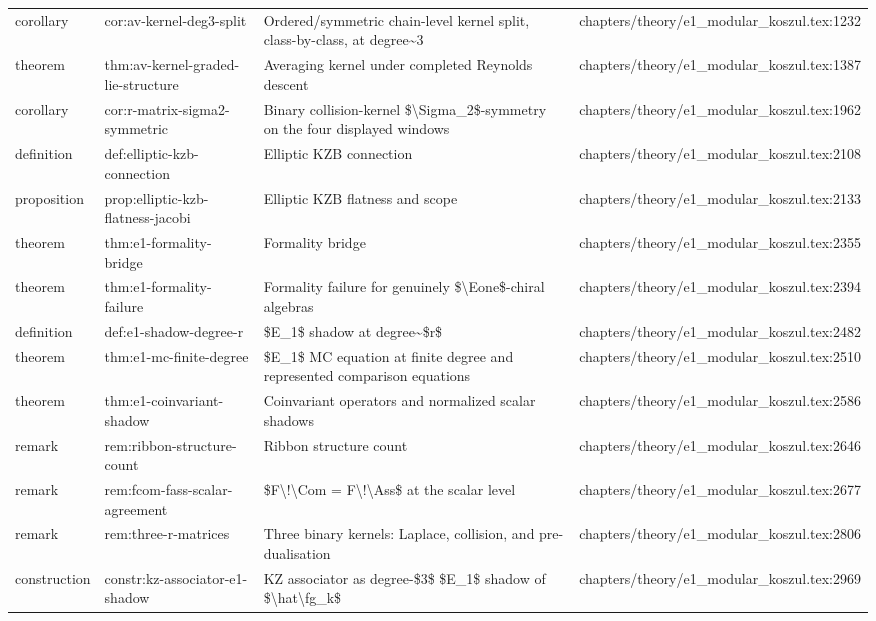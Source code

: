 \documentclass[11pt]{article}
\begin{document}
\begin{longtable}{L{0.10\textwidth}L{0.26\textwidth}L{0.42\textwidth}L{0.22\textwidth}}
corollary & cor:av-kernel-deg3-split & Ordered/symmetric chain-level kernel split, class-by-class, at degree\textasciitilde{}3 & chapters/theory/e1\_modular\_koszul.tex:1232\\
theorem & thm:av-kernel-graded-lie-structure & Averaging kernel under completed Reynolds descent & chapters/theory/e1\_modular\_koszul.tex:1387\\
corollary & cor:r-matrix-sigma2-symmetric & Binary collision-kernel \$\textbackslash{}Sigma\_2\$-symmetry on the four displayed windows & chapters/theory/e1\_modular\_koszul.tex:1962\\
definition & def:elliptic-kzb-connection & Elliptic KZB connection & chapters/theory/e1\_modular\_koszul.tex:2108\\
proposition & prop:elliptic-kzb-flatness-jacobi & Elliptic KZB flatness and scope & chapters/theory/e1\_modular\_koszul.tex:2133\\
theorem & thm:e1-formality-bridge & Formality bridge & chapters/theory/e1\_modular\_koszul.tex:2355\\
theorem & thm:e1-formality-failure & Formality failure for genuinely \$\textbackslash{}Eone\$-chiral algebras & chapters/theory/e1\_modular\_koszul.tex:2394\\
definition & def:e1-shadow-degree-r & \$E\_1\$ shadow at degree\textasciitilde{}\$r\$ & chapters/theory/e1\_modular\_koszul.tex:2482\\
theorem & thm:e1-mc-finite-degree & \$E\_1\$ MC equation at finite degree and represented comparison equations & chapters/theory/e1\_modular\_koszul.tex:2510\\
theorem & thm:e1-coinvariant-shadow & Coinvariant operators and normalized scalar shadows & chapters/theory/e1\_modular\_koszul.tex:2586\\
remark & rem:ribbon-structure-count & Ribbon structure count & chapters/theory/e1\_modular\_koszul.tex:2646\\
remark & rem:fcom-fass-scalar-agreement & \$F\textbackslash{}!\textbackslash{}Com = F\textbackslash{}!\textbackslash{}Ass\$ at the scalar level & chapters/theory/e1\_modular\_koszul.tex:2677\\
remark & rem:three-r-matrices & Three binary kernels: Laplace, collision, and pre-dualisation & chapters/theory/e1\_modular\_koszul.tex:2806\\
construction & constr:kz-associator-e1-shadow & KZ associator as degree-\$3\$ \$E\_1\$ shadow of \$\textbackslash{}hat\textbackslash{}fg\_k\$ & chapters/theory/e1\_modular\_koszul.tex:2969\\

\end{longtable}
\end{document}
